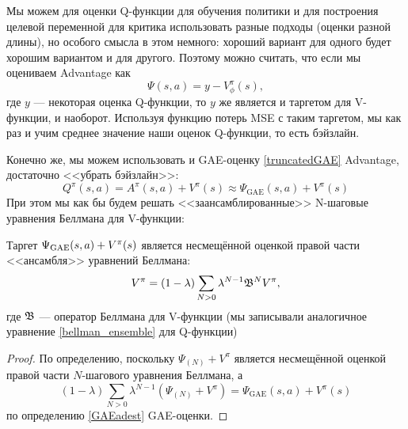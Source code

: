 Мы можем для оценки Q-функции для обучения политики и для построения целевой переменной для критика использовать разные подходы (оценки разной длины), но особого смысла в этом немного: хороший вариант для одного будет хорошим вариантом и для другого. Поэтому можно считать, что если мы оцениваем Advantage как
$$\Psi(s, a) = y - V_{\phi}^{\pi}(s),$$
где $y$ --- некоторая оценка Q-функции, то $y$ же является и таргетом для V-функции, и наоборот. Используя функцию потерь MSE с таким таргетом, мы как раз и учим среднее значение наши оценок Q-функции, то есть бэйзлайн.

Конечно же, мы можем использовать и GAE-оценку \eqref{truncatedGAE} Advantage, достаточно <<убрать бэйзлайн>>:
$$Q^\pi(s, a) = A^\pi(s, a) + V^\pi(s) \approx \Psi_{\mathrm{GAE}}(s, a) + V^\pi(s)$$
При этом мы как бы будем решать <<заансамблированные>> N-шаговые уравнения Беллмана для V-функции: 

\begin{proposition}
Таргет $\Psi_{\mathrm{GAE}}(s, a) \HM+ V^\pi(s)$ является несмещённой оценкой правой части <<ансамбля>> уравнений Беллмана:
$$V^{\pi} = (1 - \lambda) \sum_{N > 0} \lambda^{N-1} \mathfrak{B}^N V^{\pi},$$
где $\mathfrak{B}$ --- оператор Беллмана для V-функции (мы записывали аналогичное уравнение \eqref{bellman_ensemble} для Q-функции)
\begin{proof}
По определению, поскольку $\Psi_{(N)} + V^{\pi}$ является несмещённой оценкой правой части $N$-шагового уравнения Беллмана, а
$$(1 - \lambda) \sum_{N > 0} \lambda^{N-1} (\Psi_{(N)} + V^{\pi}) = \Psi_{\mathrm{GAE}}(s, a) + V^\pi(s)$$
по определению \eqref{GAEadest} GAE-оценки.
\end{proof}
\end{proposition}



